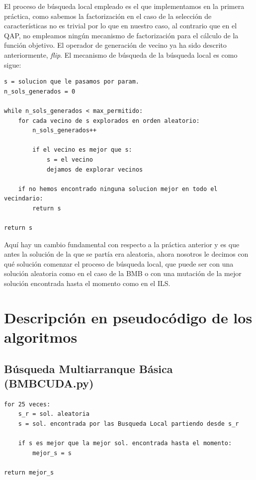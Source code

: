 \documentclass[10pt,a4paper]{article}
\begin{document}
El proceso de búsqueda local empleado es el que implementamos en la primera práctica, como sabemos la factorización en el caso de la selección de características no es trivial por lo que en nuestro caso, al contrario que en el QAP, no empleamos ningún mecanismo de factorización para el cálculo de la función objetivo. El operador de generación de vecino ya ha sido descrito anteriormente, \textit{flip}. El mecanismo de búsqueda de la búsqueda local es como sigue:\\

\begin{lstlisting}
s = solucion que le pasamos por param.
n_sols_generados = 0

while n_sols_generados < max_permitido:
	for cada vecino de s explorados en orden aleatorio:
		n_sols_generados++
		
		if el vecino es mejor que s:
			s = el vecino
			dejamos de explorar vecinos
					
	if no hemos encontrado ninguna solucion mejor en todo el vecindario:
		return s
		
return s
\end{lstlisting}

Aquí hay un cambio fundamental con respecto a la práctica anterior y es que antes la solución de la que se partía era aleatoria, ahora nosotros le decimos con qué solución comenzar el proceso de búsqueda local, que puede ser con una solución aleatoria como en el caso de la BMB o con una mutación de la mejor solución encontrada hasta el momento como en el ILS.\\

\newpage

\section{\color[rgb]{0.0,0.0,0.21}Descripción en pseudocódigo de los algoritmos}
\subsection{\color[rgb]{0.0,0.0,0.51}Búsqueda Multiarranque Básica (BMBCUDA.py)}

\begin{lstlisting}
for 25 veces:
	s_r = sol. aleatoria
	s = sol. encontrada por las Busqueda Local partiendo desde s_r
	
	if s es mejor que la mejor sol. encontrada hasta el momento:
		mejor_s = s
		
return mejor_s
\end{lstlisting}
\end{document}
